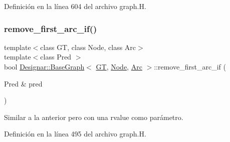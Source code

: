 Definición en la línea 604 del archivo graph.\+H.

\mbox{\label{class_designar_1_1_base_graph_ae45255ef62c056e76c5e5c45182e9490}} 
\subsubsection{\texorpdfstring{remove\+\_\+first\+\_\+arc\+\_\+if()}{remove\_first\_arc\_if()}\hspace{0.1cm}{\footnotesize\ttfamily [1/2]}}
{\footnotesize\ttfamily template$<$class GT, class Node, class Arc$>$ \\
template$<$class Pred $>$ \\
bool \hyperlink{class_designar_1_1_base_graph}{Designar\+::\+Base\+Graph}$<$ \hyperlink{demo-buildgraph_8_c_a3001c40d2c31ca87ed96cd7d1334a55e}{GT}, \hyperlink{namespace_designar_a5af326c65aa2bd26b26c410f2030d09e}{Node}, \hyperlink{namespace_designar_a3f55fb5513d62ff47cbc8f72b8e95d6f}{Arc} $>$\+::remove\+\_\+first\+\_\+arc\+\_\+if (\begin{DoxyParamCaption}\item[{Pred \&}]{pred }\end{DoxyParamCaption})\hspace{0.3cm}{\ttfamily [inline]}}



Similar a la anterior pero con una rvalue como parámetro. 



Definición en la línea 495 del archivo graph.\+H.

\mbox{\label{class_designar_1_1_base_graph_a990426c9e87f922bbbd0c9bc4d2cedd8}} 
